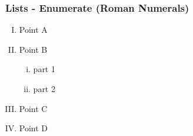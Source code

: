 \label{enumerateRomanNumerals}
\begin{frame}\frametitle{Lists - Enumerate (Roman Numerals)}
  \begin{enumerate} [(I)]
	\item Point A
	\item Point B
	\begin{enumerate} [(i)]
	  \item part 1
      \item part 2
	\end{enumerate}
	\item Point C
	\item Point D
  \end{enumerate}
\end{frame} 